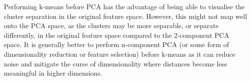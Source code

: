     Performing k-means before PCA has the advantage of being able to visualise the cluster separation in the original
    feature space.
    However, this might not map well onto the PCA space, as the clusters may be more separable, or separate differently,
    in the original feature space compared to the 2-component PCA space.
    It is generally better to perform n-component PCA (or some form of dimensionality reduction or feature selection)
    before k-means as it can reduce noise and mitigate the curse of dimensionality \cite{bellman1957} where distances
    become less meaningful in higher dimensions.
